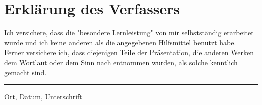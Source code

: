 \documentclass[12pt, ngerman]{article}
\begin{document}
\newpage
\section{Erklärung des Verfassers}
Ich versichere, dass die "besondere Lernleistung" von mir selbstständig
erarbeitet wurde und ich keine anderen als die angegebenen Hilfsmittel benutzt
habe. Ferner versichere ich, dass diejenigen Teile der Präsentation, die anderen
Werken dem Wortlaut oder dem Sinn nach entnommen wurden, als solche kenntlich
gemacht sind.

\vspace{50pt}
\parbox{8cm}{\hrule \strut \centering\footnotesize Ort, Datum, Unterschrift}


\newpage
\nocite{*}
{}
 
\end{document}
